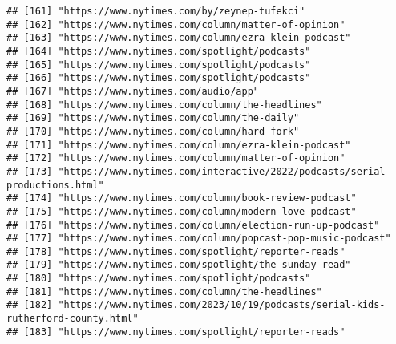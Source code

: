 \documentclass[
]{article}
\begin{document}
\begin{verbatim}
## [161] "https://www.nytimes.com/by/zeynep-tufekci"                                                                 
## [162] "https://www.nytimes.com/column/matter-of-opinion"                                                          
## [163] "https://www.nytimes.com/column/ezra-klein-podcast"                                                         
## [164] "https://www.nytimes.com/spotlight/podcasts"                                                                
## [165] "https://www.nytimes.com/spotlight/podcasts"                                                                
## [166] "https://www.nytimes.com/spotlight/podcasts"                                                                
## [167] "https://www.nytimes.com/audio/app"                                                                         
## [168] "https://www.nytimes.com/column/the-headlines"                                                              
## [169] "https://www.nytimes.com/column/the-daily"                                                                  
## [170] "https://www.nytimes.com/column/hard-fork"                                                                  
## [171] "https://www.nytimes.com/column/ezra-klein-podcast"                                                         
## [172] "https://www.nytimes.com/column/matter-of-opinion"                                                          
## [173] "https://www.nytimes.com/interactive/2022/podcasts/serial-productions.html"                                 
## [174] "https://www.nytimes.com/column/book-review-podcast"                                                        
## [175] "https://www.nytimes.com/column/modern-love-podcast"                                                        
## [176] "https://www.nytimes.com/column/election-run-up-podcast"                                                    
## [177] "https://www.nytimes.com/column/popcast-pop-music-podcast"                                                  
## [178] "https://www.nytimes.com/spotlight/reporter-reads"                                                          
## [179] "https://www.nytimes.com/spotlight/the-sunday-read"                                                         
## [180] "https://www.nytimes.com/spotlight/podcasts"                                                                
## [181] "https://www.nytimes.com/column/the-headlines"                                                              
## [182] "https://www.nytimes.com/2023/10/19/podcasts/serial-kids-rutherford-county.html"                            
## [183] "https://www.nytimes.com/spotlight/reporter-reads"                                                          

\end{verbatim}
\end{document}
